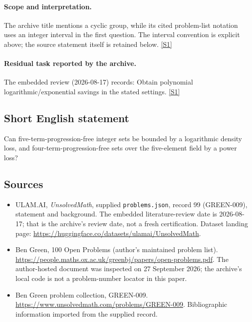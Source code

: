 \documentclass[11pt,a4paper]{article}
\newcommand{\sref}[2]{\hyperlink{source:#1:#2}{[S#2]}}
\begin{document}
\paragraph{Scope and interpretation.}

The archive title mentions a cyclic group, while its cited problem-list notation uses an integer interval in the first question. The interval convention is explicit above; the source statement itself is retained below. \sref{99}{1}

\paragraph{Residual task reported by the archive.}

The embedded review (2026-08-17) records: Obtain polynomial logarithmic/exponential savings in the stated settings. \sref{99}{1}

\subsection{Short English statement}

Can five-term-progression-free integer sets be bounded by a logarithmic density loss, and four-term-progression-free sets over the five-element field by a power loss?

\subsection{Sources}

{\small

\begin{itemize}

\item[\hypertarget{source:99:1}{S1}] ULAM.AI, \emph{UnsolvedMath}, supplied \texttt{problems.json}, record 99 (GREEN-009), statement and background. The embedded literature-review date is 2026-08-17; that is the archive’s review date, not a fresh certification. Dataset landing page: \url{https://huggingface.co/datasets/ulamai/UnsolvedMath}.

\item[\hypertarget{source:99:2}{S2}] Ben Green, 100 Open Problems (author’s maintained problem list). \url{https://people.maths.ox.ac.uk/greenbj/papers/open-problems.pdf}. The author-hosted document was inspected on 27 September 2026; the archive’s local code is not a problem-number locator in this paper.

\item[\hypertarget{source:99:3}{S3}] Ben Green problem collection, GREEN-009. \url{https://www.unsolvedmath.com/problems/GREEN-009}. Bibliographic information imported from the supplied record.

\end{itemize}

}

\label{end:99}
\end{document}
